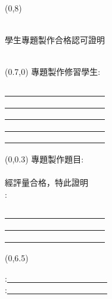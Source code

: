 \documentclass[UTF8]{ctexart}
\newcommand{\eigh}{\fontsize{18pt}{\baselineskip}\selectfont}%
\newcommand{\fourteen}{\fontsize{14pt}{\baselineskip}\selectfont}%
\begin{document}
    {\begin{textblock}{12}(0,8)
    {\begin{center}
    \noindent \kaishu \eigh {}
    \end{center}}
    \end{textblock}}
    \newpage
    {\begin{center}
    {\renewcommand\baselinestretch{1.4}
    \kaishu \eigh {國立虎尾科技大學 \qquad 機械設計工程系}\\{學生專題製作合格認可證明}\\
    \hspace*{\fill} \\ %
    \par}
     \end{center}}
    {\begin{textblock}{60}(0.7,0)
    \noindent \kaishu \fourteen 專題製作修習學生\enspace:\quad
    {\begin{minipage}[t]{10em}\underline{　　　　　　　　　　　　}\\ \underline{　　　　　　　　　　　　}\\ \underline{　　　　　　　　　　　　}\\ \underline{　　　　　　　　　　　　}\\ \underline{　　　　　　　　　　　　}\\ %
    \end{minipage}}
    {\begin{textblock}{30}(0,0.3)
    \noindent \kaishu \fourteen 專題製作題目\enspace:\quad
    \hspace*{\fill} \\
    \hspace*{\fill} \\
    \noindent \kaishu \fourteen 經評量合格，特此證明
    \hspace*{\fill} \\
    \noindent \kaishu \fourteen {}\enspace:\quad
    {\begin{minipage}[t]{6em} \underline{　　　　　　　　　　　　}\\ \underline{　　　　　　　　　　　　}\\ \underline{　　　　　　　　　　　　}\\
    \end{minipage}}
    \end{textblock}}
    {\begin{textblock}{10}(0,6.5)
    {\begin{flushleft}
    \kaishu \fourteen {}\enspace:\quad \underline{　　　　　　　　　　　　}\\
    \kaishu \fourteen {}\enspace:\quad \underline{　　　　　　　　　　　　}\\
    \hspace*{\fill} \\
    \kaishu \fourteen {}\qquad{}\qquad{}\qquad{}
    \end{flushleft}}
    \end{textblock}}
    \end{textblock}}
\end{document}
